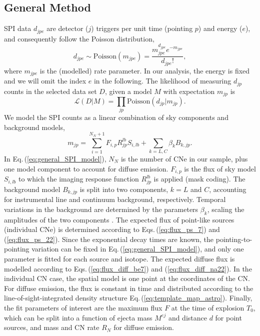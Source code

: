 \documentclass{aa}
\newcommand{\mrm}[1]{\mathrm{#1}}
\begin{document}
\subsection{General Method}\label{sec:general_SPI_analysis}
%
SPI data $d_{jpe}$ are detector ($j$) triggers per unit time (pointing $p$) and energy ($e$), and consequently follow the Poisson distribution,
%
\begin{equation}
	d_{jpe} \sim \mrm{Poisson}(m_{jpe}) = \frac{m_{jpe}^{d_{jpe}}e^{-m_{jpe}}}{d_{jpe}!}\mrm{,}
	\label{eq:Poisson_dist}
\end{equation}
%
where $m_{jpe}$ is the (modelled) rate parameter.
%
In our analysis, the energy is fixed and we will omit the index $e$ in the following.
%
The likelihood of measuring $d_{jp}$ counts in the selected data set $D$, given a model $M$ with expectation $m_{jp}$ is
%
\begin{equation}
	\mathscr{L}(D|M) = \prod_{jp} \mrm{Poisson}(d_{jp}|m_{jp})\mrm{.}
\end{equation}
%
We model the SPI counts as a linear combination of sky components and background models,
%
\begin{equation}
	m_{jp} =  \sum_{i=1}^{N_N+1} F_{i,p} R_{jp}^{lb} S_{i,lb} + \sum_{k={L,C}} \beta_k B_{k,jp}\mrm{.}
	\label{eq:general_SPI_model}
\end{equation}
%
In Eq.\,(\ref{eq:general_SPI_model}), $N_N$ is the number of CNe in our sample, plus one model component to account for diffuse emission.
%
$F_{i,p}$ is the flux of sky model $S_{i,lb}$ to which the imaging response function $R_{jp}^{lb}$ is applied (mask coding).
%
The background model $B_{k,jp}$ is split into two components, $k=L$ and $C$, accounting for instrumental line and continuum background, respectively.
%
Temporal variations in the background are determined by the parameters $\beta_k$, scaling the amplitudes of the two components \citep[c.f.][]{Siegert2019_SPIBG}.
%
The expected flux of point-like sources (individual CNe) is determined according to Eqs.\,(\ref{eq:flux_ps_7}) and (\ref{eq:flux_ps_22}).
%
Since the exponential decay times are known, the pointing-to-pointing variation can be fixed in Eq.\,(\ref{eq:general_SPI_model}), and only one parameter is fitted for each source and isotope.
%
The expected diffuse flux is modelled according to Eqs.\,(\ref{eq:flux_diff_be7}) and (\ref{eq:flux_diff_na22}).
%
In the individual CN case, the spatial model is one point at the coordinates of the CN.
%
For diffuse emission, the flux is constant in time and distributed according to the line-of-sight-integrated density structure Eq.\,(\ref{eq:template_map_astro}).
%
Finally, the fit parameters of interest are the maximum flux $F$ at the time of explosion $T_0$, which can be split into a function of ejecta mass $M^{ej}$ and distance $d$ for point sources, and mass and CN rate $R_N$ for diffuse emission.
\end{document}
